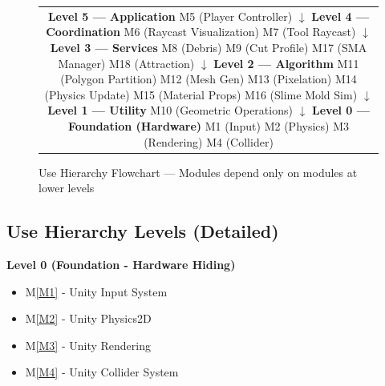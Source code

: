 \documentclass[12pt, titlepage]{article}
\newcommand{\mref}[1]{M\ref{#1}}
\begin{document}
\begin{figure}[H]
\centering
\begin{tabular}{c}
\fbox{\parbox{0.85\textwidth}{
\centering
\vspace{4pt}
\textbf{Level 5 --- Application} \\
M5 (Player Controller) \\[6pt]
$\downarrow$ \\[6pt]
\textbf{Level 4 --- Coordination} \\
M6 (Raycast Visualization) \quad M7 (Tool Raycast) \\[6pt]
$\downarrow$ \\[6pt]
\textbf{Level 3 --- Services} \\
M8 (Debris) \quad M9 (Cut Profile) \quad M17 (SMA Manager) \quad M18 (Attraction) \\[6pt]
$\downarrow$ \\[6pt]
\textbf{Level 2 --- Algorithm} \\
M11 (Polygon Partition) \quad M12 (Mesh Gen) \quad M13 (Pixelation) \\
M14 (Physics Update) \quad M15 (Material Props) \quad M16 (Slime Mold Sim) \\[6pt]
$\downarrow$ \\[6pt]
\textbf{Level 1 --- Utility} \\
M10 (Geometric Operations) \\[6pt]
$\downarrow$ \\[6pt]
\textbf{Level 0 --- Foundation (Hardware)} \\
M1 (Input) \quad M2 (Physics) \quad M3 (Rendering) \quad M4 (Collider) \\
\vspace{4pt}
}}
\end{tabular}
\caption{Use Hierarchy Flowchart --- Modules depend only on modules at lower levels}
\label{FigUseHierarchy}
\end{figure}

\subsection{Use Hierarchy Levels (Detailed)}

\textbf{Level 0 (Foundation - Hardware Hiding)}\\
\begin{itemize}
\item \mref{M1} - Unity Input System
\item \mref{M2} - Unity Physics2D
\item \mref{M3} - Unity Rendering
\item \mref{M4} - Unity Collider System
\end{itemize}
\end{document}
